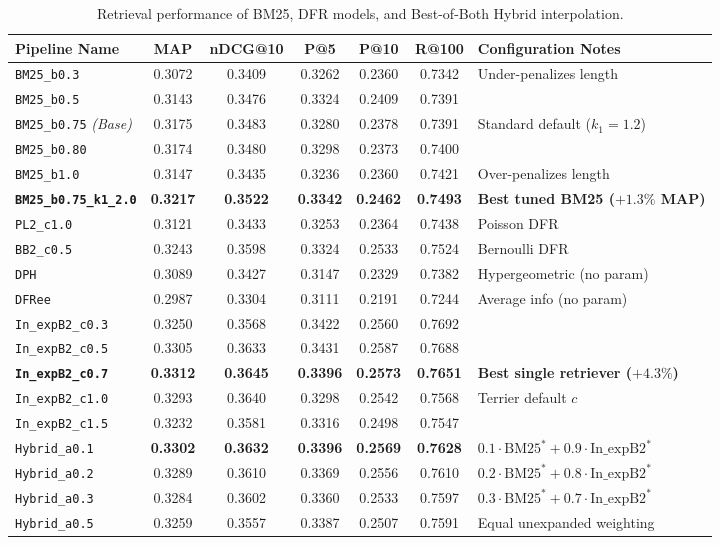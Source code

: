 \documentclass[10pt, a4paper]{article}
\begin{document}
\begin{table}[H]
\centering
\small
\begin{tabular}{@{}lcccccl@{}}
\toprule
\textbf{Pipeline Name} & \textbf{MAP} & \textbf{nDCG@10} & \textbf{P@5} & \textbf{P@10} & \textbf{R@100} & \textbf{Configuration Notes} \\ \midrule
\texttt{BM25\_b0.3} & 0.3072 & 0.3409 & 0.3262 & 0.2360 & 0.7342 & Under-penalizes length \\
\texttt{BM25\_b0.5} & 0.3143 & 0.3476 & 0.3324 & 0.2409 & 0.7391 & \\
\texttt{BM25\_b0.75} \textit{(Base)} & 0.3175 & 0.3483 & 0.3280 & 0.2378 & 0.7391 & Standard default ($k_1=1.2$) \\
\texttt{BM25\_b0.80} & 0.3174 & 0.3480 & 0.3298 & 0.2373 & 0.7400 & \\
\texttt{BM25\_b1.0} & 0.3147 & 0.3435 & 0.3236 & 0.2360 & 0.7421 & Over-penalizes length \\
\textbf{\texttt{BM25\_b0.75\_k1\_2.0}} & \textbf{0.3217} & \textbf{0.3522} & \textbf{0.3342} & \textbf{0.2462} & \textbf{0.7493} & \textbf{Best tuned BM25 ($+1.3\%$ MAP)} \\ \midrule
\texttt{PL2\_c1.0} & 0.3121 & 0.3433 & 0.3253 & 0.2364 & 0.7438 & Poisson DFR \\
\texttt{BB2\_c0.5} & 0.3243 & 0.3598 & 0.3324 & 0.2533 & 0.7524 & Bernoulli DFR \\
\texttt{DPH} & 0.3089 & 0.3427 & 0.3147 & 0.2329 & 0.7382 & Hypergeometric (no param) \\
\texttt{DFRee} & 0.2987 & 0.3304 & 0.3111 & 0.2191 & 0.7244 & Average info (no param) \\ \midrule
\texttt{In\_expB2\_c0.3} & 0.3250 & 0.3568 & 0.3422 & 0.2560 & 0.7692 & \\
\texttt{In\_expB2\_c0.5} & 0.3305 & 0.3633 & 0.3431 & 0.2587 & 0.7688 & \\
\textbf{\texttt{In\_expB2\_c0.7}} & \textbf{0.3312} & \textbf{0.3645} & \textbf{0.3396} & \textbf{0.2573} & \textbf{0.7651} & \textbf{Best single retriever ($+4.3\%$)} \\
\texttt{In\_expB2\_c1.0} & 0.3293 & 0.3640 & 0.3298 & 0.2542 & 0.7568 & Terrier default $c$ \\
\texttt{In\_expB2\_c1.5} & 0.3232 & 0.3581 & 0.3316 & 0.2498 & 0.7547 & \\ \midrule
\texttt{Hybrid\_a0.1} & \textbf{0.3302} & \textbf{0.3632} & \textbf{0.3396} & \textbf{0.2569} & \textbf{0.7628} & $0.1 \cdot \text{BM25}^* + 0.9 \cdot \text{In\_expB2}^*$ \\
\texttt{Hybrid\_a0.2} & 0.3289 & 0.3610 & 0.3369 & 0.2556 & 0.7610 & $0.2 \cdot \text{BM25}^* + 0.8 \cdot \text{In\_expB2}^*$ \\
\texttt{Hybrid\_a0.3} & 0.3284 & 0.3602 & 0.3360 & 0.2533 & 0.7597 & $0.3 \cdot \text{BM25}^* + 0.7 \cdot \text{In\_expB2}^*$ \\
\texttt{Hybrid\_a0.5} & 0.3259 & 0.3557 & 0.3387 & 0.2507 & 0.7591 & Equal unexpanded weighting \\ \bottomrule
\end{tabular}
\caption{Retrieval performance of BM25, DFR models, and Best-of-Both Hybrid interpolation.}
\label{tab:results_bm25_dfr}
\end{table}
\end{document}
